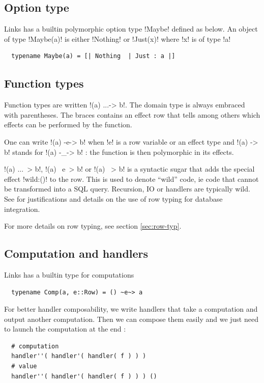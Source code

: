 \documentclass[10pt, nonacm=true, language=french, language=english]{acmart}
\begin{document}
\subsection{Option type}
\label{sec:tech:maybe}
Links has a builtin polymorphic option type !Maybe! defined as below. An object of type !Maybe(a)! is either !Nothing! or !Just(x)! where !x! is of type !a!
\begin{lstlisting}
  typename Maybe(a) = [| Nothing  | Just : a |]
\end{lstlisting}

\subsection{Function types}
Function types are written !(a) {...}-> b!. The domain type is always embraced with parentheses. The braces contains an effect row that tells among others which effects can be performed by the function.

One can write !(a) -e-> b! when !e! is a row variable or an effect type and !(a) -> b! stands for !(a) -_-> b! : the function is then polymorphic in its effects.

!(a) {...}~> b!, !(a) ~e~> b! or !(a) ~> b! is a syntactic sugar that adds the special effect !wild:()! to the row. This is used to denote ``wild'' code, ie code that cannot be transformed into a SQL query. Recursion, IO or handlers are typically wild. See \citep{corelinks} for justifications and details on the use of row typing for database integration.

For more details on row typing, see section \ref{sec:row-typ}.

\subsection{Computation and handlers}
\label{sec:computation-handlers}
Links has a builtin type for computations
\begin{lstlisting}
  typename Comp(a, e::Row) = () ~e~> a
\end{lstlisting}

For better handler composability, we write handlers that take a computation and output another computation. Then we can compose them easily and we just need to launch the computation at the end :
\begin{lstlisting}
  # computation
  handler''( handler'( handler( f ) ) )
  # value
  handler''( handler'( handler( f ) ) ) ()
\end{lstlisting}
\end{document}
